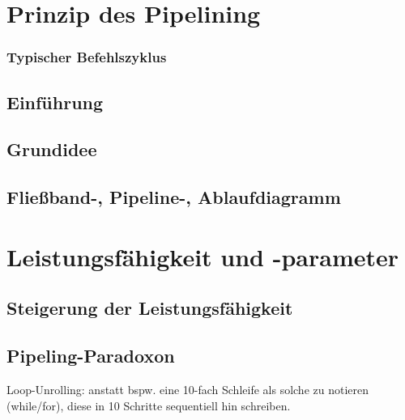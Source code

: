 
\section{Prinzip des Pipelining}

\subsubsection{Typischer Befehlszyklus}

\subsection{Einführung}

\subsection{Grundidee}

\subsection{Fließband-, Pipeline-, Ablaufdiagramm}

\section{Leistungsfähigkeit und -parameter}
\subsection{Steigerung der Leistungsfähigkeit}
\subsection{Pipeling-Paradoxon}
Loop-Unrolling: anstatt bspw. eine 10-fach Schleife als solche zu notieren (while/for), diese in 10 Schritte sequentiell hin schreiben.

